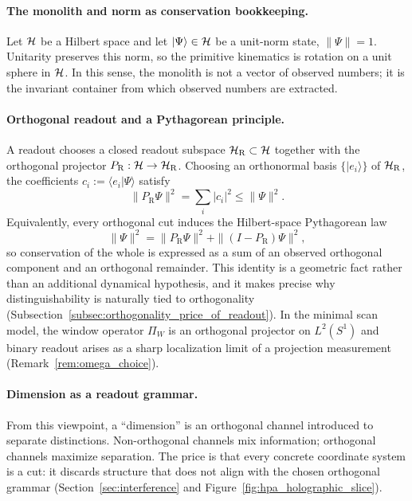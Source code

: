 \paragraph{The monolith and norm as conservation bookkeeping.}
Let $\mathcal{H}$ be a Hilbert space and let $|\Psi\rangle\in\mathcal{H}$ be a unit-norm state, $\|\Psi\|=1$.
Unitarity preserves this norm, so the primitive kinematics is rotation on a unit sphere in $\mathcal{H}$.
In this sense, the monolith is not a vector of observed numbers; it is the invariant container from which observed numbers are extracted.

\paragraph{Orthogonal readout and a Pythagorean principle.}
A readout chooses a closed readout subspace $\mathcal{H}_{\mathrm{R}}\subset\mathcal{H}$ together with the orthogonal projector $P_{\mathrm{R}}:\mathcal{H}\to\mathcal{H}_{\mathrm{R}}$.
Choosing an orthonormal basis $\{|e_i\rangle\}$ of $\mathcal{H}_{\mathrm{R}}$, the coefficients $c_i:=\langle e_i|\Psi\rangle$ satisfy
$$
\|P_{\mathrm{R}}\Psi\|^2=\sum_i |c_i|^2\le \|\Psi\|^2.
$$
Equivalently, every orthogonal cut induces the Hilbert-space Pythagorean law
$$
\|\Psi\|^2=\|P_{\mathrm{R}}\Psi\|^2+\|(I-P_{\mathrm{R}})\Psi\|^2,
$$
so conservation of the whole is expressed as a sum of an observed orthogonal component and an orthogonal remainder.
This identity is a geometric fact rather than an additional dynamical hypothesis, and it makes precise why distinguishability is naturally tied to orthogonality (Subsection~\ref{subsec:orthogonality_price_of_readout}).
In the minimal scan model, the window operator $\Pi_W$ is an orthogonal projector on $L^2(S^1)$ and binary readout arises as a sharp localization limit of a projection measurement (Remark~\ref{rem:omega_choice}).

\paragraph{Dimension as a readout grammar.}
From this viewpoint, a ``dimension'' is an orthogonal channel introduced to separate distinctions.
Non-orthogonal channels mix information; orthogonal channels maximize separation.
The price is that every concrete coordinate system is a cut: it discards structure that does not align with the chosen orthogonal grammar (Section~\ref{sec:interference} and Figure~\ref{fig:hpa_holographic_slice}).

